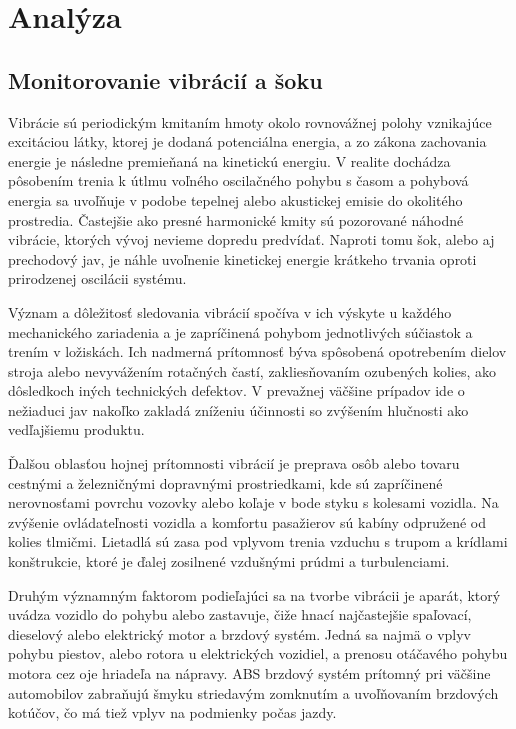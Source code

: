 \chapter{Analýza}

\section{Monitorovanie vibrácií a šoku}
Vibrácie sú periodickým kmitaním hmoty okolo rovnovážnej polohy vznikajúce excitáciou látky, ktorej je dodaná potenciálna energia, a zo 
zákona zachovania energie je následne premieňaná na kinetickú energiu. V realite dochádza pôsobením trenia k útlmu voľného oscilačného 
pohybu s časom  a pohybová energia sa uvoľňuje v podobe tepelnej alebo akustickej emisie do okolitého prostredia. Častejšie ako presné 
harmonické kmity sú pozorované náhodné vibrácie, ktorých vývoj nevieme dopredu predvídať. Naproti tomu šok, alebo aj prechodový jav, je 
náhle uvoľnenie kinetickej energie krátkeho trvania oproti prirodzenej oscilácii systému. 

Význam a dôležitosť sledovania vibrácií spočíva v ich výskyte u každého mechanického zariadenia a je zapríčinená pohybom jednotlivých 
súčiastok a trením v ložiskách. Ich nadmerná prítomnosť býva spôsobená opotrebením dielov stroja alebo nevyvážením rotačných častí, 
zakliesňovaním ozubených kolies, ako dôsledkoch iných technických defektov. V prevažnej väčšine prípadov ide o nežiaduci jav nakoľko 
zakladá zníženiu účinnosti so zvýšením hlučnosti ako vedľajšiemu produktu. 

Ďalšou oblasťou hojnej prítomnosti vibrácií je preprava osôb alebo tovaru cestnými a železničnými dopravnými prostriedkami, kde sú 
zapríčinené nerovnosťami povrchu vozovky alebo koľaje v bode styku s kolesami vozidla. Na zvýšenie ovládateľnosti vozidla a komfortu 
pasažierov sú kabíny odpružené od kolies tlmičmi. Lietadlá sú zasa pod vplyvom trenia vzduchu s trupom a krídlami konštrukcie, ktoré je 
ďalej zosilnené vzdušnými prúdmi a turbulenciami. 

Druhým významným faktorom podieľajúci sa na tvorbe vibrácii je aparát, ktorý uvádza vozidlo do pohybu alebo zastavuje, čiže hnací 
najčastejšie spaľovací, dieselový alebo elektrický motor a brzdový systém. Jedná sa najmä o vplyv pohybu piestov, alebo rotora u 
elektrických vozidiel, a prenosu otáčavého pohybu motora cez oje hriadeľa na nápravy. ABS brzdový systém prítomný pri väčšine
automobilov zabraňujú šmyku striedavým zomknutím a uvoľňovaním brzdových kotúčov, čo má tiež vplyv na podmienky počas jazdy.

